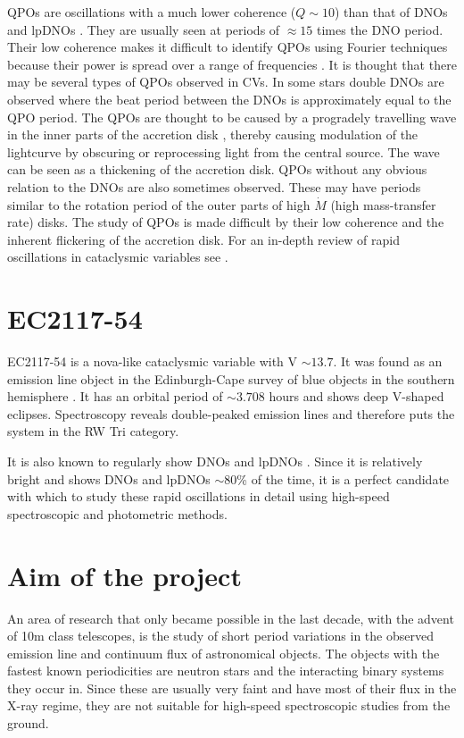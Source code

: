 QPOs are oscillations with a much lower coherence ($Q \sim 10 $) than that of DNOs and lpDNOs \citep{WWP}. They are usually seen at periods of $\approx 15$ times the DNO period. Their low coherence makes it difficult to identify QPOs using Fourier techniques because their power is spread over a range of frequencies \citep{warner_ro2004}. It is thought that there may be several types of QPOs observed in CVs. In some stars double DNOs are observed where the beat period between the DNOs is approximately equal to the QPO period. The QPOs are thought to be caused by a progradely travelling wave in the inner parts of the accretion disk \citep{warner_ro2004}, thereby causing modulation of the lightcurve by obscuring or reprocessing light from the central source. The wave can be seen as a thickening of the accretion disk. QPOs without any obvious relation to the DNOs are also sometimes observed. These may have periods similar to the rotation period of the outer parts of high $\dot{M}$ (high mass-transfer rate) disks. The study of QPOs is made difficult by their low coherence and the inherent flickering of the accretion disk.  For an in-depth review of rapid oscillations in cataclysmic variables see \cite{warner_ro2004}.
 

\section{EC2117-54}
\label{ec2117}

EC2117-54 is a nova-like cataclysmic variable with V $\sim13.7$. It was found as an emission line object in the Edinburgh-Cape survey of blue objects in the southern hemisphere \citep{ecsurvey}. It has an orbital period of $\sim3.708$ hours and shows deep V-shaped eclipses. Spectroscopy reveals double-peaked emission lines and therefore puts the system in the RW Tri category. 

It is also known to regularly show DNOs and lpDNOs \citep{WWP}. Since it is relatively bright and shows DNOs and lpDNOs $\sim80$\% of the time, it is a perfect candidate with which to study these rapid oscillations in detail using high-speed spectroscopic and photometric methods.



\section{Aim of the project}
\label{aim}

An area of research that only became possible in the last decade, with the advent of 10m class telescopes, 
is the study of short period variations in the observed emission line and continuum flux of astronomical objects. The objects with the fastest known periodicities are neutron stars and the interacting binary systems they occur in. Since these are usually very faint and have most of their flux in the X-ray regime, they are not suitable for high-speed spectroscopic studies from the ground. 

